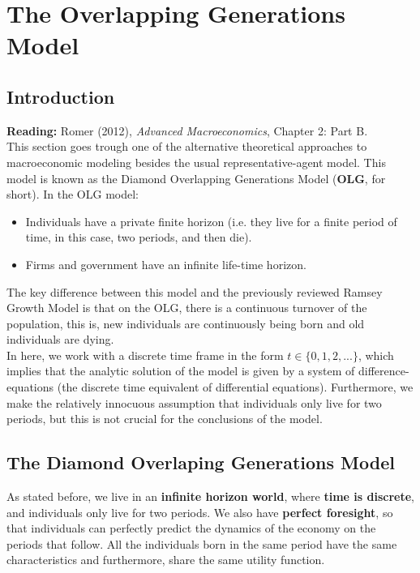 \chapter{The Overlapping Generations Model}

\section{Introduction}

\textbf{Reading:} Romer (2012), \textit{Advanced Macroeconomics}, Chapter 2: Part B.\\

This section goes trough one of the alternative theoretical approaches to macroeconomic modeling besides the usual representative-agent model. This model is known as the Diamond Overlapping Generations Model (\textbf{OLG}, for short). In the OLG model:
\begin{itemize}
\item Individuals have a private finite horizon (i.e. they live for a finite period of time, in this case, two periods, and then die).
\item Firms and government have an infinite life-time horizon.
\end{itemize}

The key difference between this model and the previously reviewed Ramsey Growth Model is that on the OLG, there is a continuous turnover of the population, this is, new individuals are continuously being born and old individuals are dying.\\

In here, we work with a discrete time frame in the form $t\in\{ 0,1,2,... \}$, which implies that the analytic solution of the model is given by a system of difference-equations (the discrete time equivalent of differential equations). Furthermore, we make the relatively innocuous assumption that individuals only live for two periods, but this is not crucial for the conclusions of the model.

\section{The Diamond Overlaping Generations Model}

As stated before, we live in an \textbf{infinite horizon world}, where \textbf{time is discrete}, and individuals only live for two periods. We also have \textbf{perfect foresight}, so that individuals can perfectly predict the dynamics of the economy on the periods that follow. All the individuals born in the same period have the same characteristics and furthermore, share the same utility function.\\

